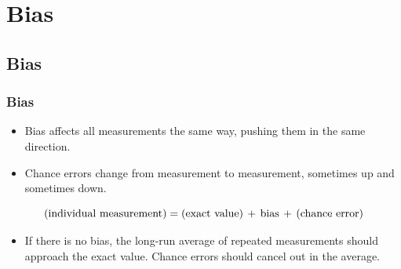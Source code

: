 \documentclass[t]{beamer}
\begin{document}
\section{Bias}
\subsection{Bias}
\begin{frame}[t]\frametitle{Bias}
{\small
\begin{itemize}
\item {\color{blue}Bias} affects all measurements the same way, pushing
  them in the same direction.
\item {\color{blue}Chance errors} change from measurement to measurement,
  sometimes up and sometimes down.\vspace{-3pt}
\end{itemize}
\[\mbox{(individual measurement)} = \mbox{(exact value)}\, +\, \mbox{bias}
  \, +\,
   \mbox{(chance error)}\vspace{-10pt}\]
\begin{itemize}
\item If there is no bias, the long-run average of repeated measurements 
  should approach the exact value.
 Chance errors should cancel out in the average.
\end{itemize}
}
\label{lastpage}
\end{frame}
\end{document}
